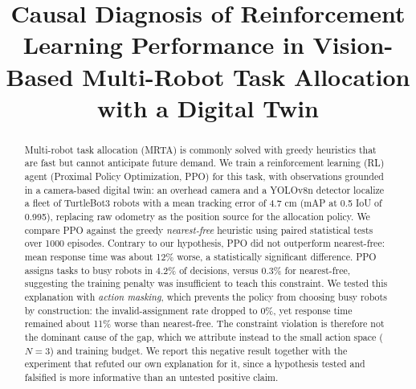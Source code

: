 \documentclass[conference]{IEEEtran}
\begin{document}
\title{Causal Diagnosis of Reinforcement Learning Performance in Vision-Based Multi-Robot Task Allocation with a Digital Twin}

\author{
\and
{}
}

\maketitle

\begin{abstract}
Multi-robot task allocation (MRTA) is commonly solved with greedy heuristics that are fast but cannot anticipate future demand. We train a reinforcement learning (RL) agent (Proximal Policy Optimization, PPO) for this task, with observations grounded in a camera-based digital twin: an overhead camera and a YOLOv8n detector localize a fleet of TurtleBot3 robots with a mean tracking error of 4.7 cm (mAP at 0.5 IoU of 0.995), replacing raw odometry as the position source for the allocation policy. We compare PPO against the greedy \textit{nearest-free} heuristic using paired statistical tests over 1000 episodes. Contrary to our hypothesis, PPO did not outperform nearest-free: mean response time was about 12\% worse, a statistically significant difference. PPO assigns tasks to busy robots in 4.2\% of decisions, versus 0.3\% for nearest-free, suggesting the training penalty was insufficient to teach this constraint. We tested this explanation with \textit{action masking}, which prevents the policy from choosing busy robots by construction: the invalid-assignment rate dropped to 0\%, yet response time remained about 11\% worse than nearest-free. The constraint violation is therefore not the dominant cause of the gap, which we attribute instead to the small action space ($N=3$) and training budget. We report this negative result together with the experiment that refuted our own explanation for it, since a hypothesis tested and falsified is more informative than an untested positive claim.
\end{abstract}
\end{document}
